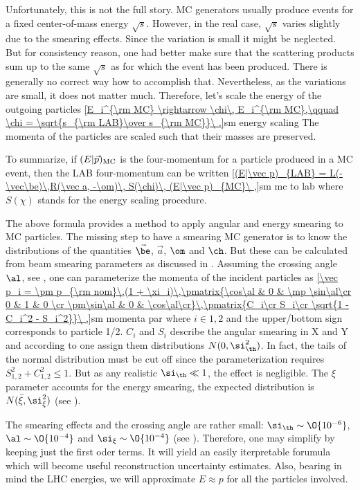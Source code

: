 Unfortunately, this is not the full story. MC generators usually produce events for a fixed center-of-mass energy $\sqrt{s}$. However, in the real case, $\sqrt{s}$ varies slightly due to the smearing effects. Since the variation is small it might be neglected. But for consistency reason, one had better make sure that the scattering products sum up to the same $\sqrt{s}$ as for which the event has been produced. There is generally no correct way how to accomplish that. Nevertheless, as the variations are small, it does not matter much. Therefore, let's scale the energy of the outgoing particles
\eqref{E_i^{\rm MC} \rightarrow \chi\, E_i^{\rm MC},\qquad \chi = \sqrt{s_{\rm LAB}\over s_{\rm MC}}\ .}{sm energy scaling}
The momenta of the particles are scaled such that their masses are preserved.

To summarize, if $(E|\vec p)_{\rm MC}$ is the four-momentum for a particle produced in a MC event, then the LAB four-momentum can be written
\eqref{(E|\vec p)_{LAB} = L(-\vec\be)\,R(\vec a, -\om)\, S(\chi)\, (E|\vec p)_{MC}\ ,}{sm mc to lab}
where $S(\chi)$ stands for the energy scaling procedure.



The above formula provides a method to apply angular and energy smearing to MC particles. The missing step to have a smearing MC generator is to know the distributions of the quantities $\vec\be$, $\vec a$, $\om$ and $\ch$. But these can be calculated from beam smearing parameters as discussed in . Assuming the crossing angle $\al$, see , one can parameterize the momenta of the incident particles as
\eqref{\vec p_i = \pm p_{\rm nom}\,(1 + \xi_i)\,\pmatrix{\cos\al & 0 & \mp \sin\al\cr 0 & 1 & 0 \cr \pm\sin\al & 0 & \cos\al\cr}\,\pmatrix{C_i\cr S_i\cr \sqrt{1 - C_i^2 - S_i^2}}\ ,}{sm momenta par}
where $i\in {1, 2}$ and the upper/bottom sign corresponds to particle 1/2. $C_i$ and $S_i$ describe the angular smearing in X and Y and according to  one assign them distributions $N(0, \si_\th^2)$. In fact, the tails of the normal distribution must be cut off since the parameterization requires $S_{1,2}^2 + C_{1,2}^2 \leq 1$. But as any realistic $\si_\th \ll 1$, the effect is negligible. The $\xi$ parameter accounts for the energy smearing, the expected distribution is $N(\bar\xi, \si_\xi^2)$ (see ).

The smearing effects and the crossing angle are rather small: $\si_\th \sim \O{10^{-6}}$, $\al \sim \O{10^{-4}}$ and $\si_\xi \sim \O{10^{-4}}$ (see ). Therefore, one may simplify  by keeping just the first oder terms. It will yield an easily iterpretable forumula which will become useful reconstruction uncertainty estimates. Also, bearing in mind the LHC energies, we will approximate $E\approx p$ for all the particles involved.

